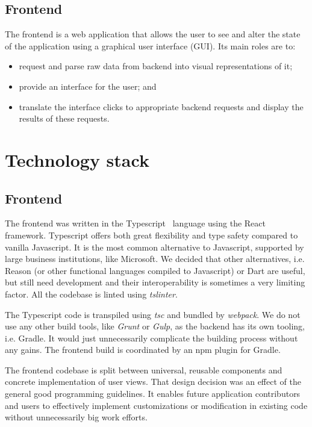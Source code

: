 \documentclass[licencjacka,en]{thesisclass}
\begin{document}
    \subsection{Frontend}
    The frontend is a web application that allows the user to see
    and alter the state of the application using a graphical user interface (GUI).
    Its main roles are to:
    \begin{itemize}
        \item request and parse raw data from backend into visual representations of it;
        \item provide an interface for the user; and
        \item translate the interface clicks to appropriate backend requests
          and display the results of these requests.
    \end{itemize}

    \section{Technology stack}

    \subsection{Frontend}

    The frontend was written in the Typescript~\cite{Typescript} language
    using the React~\cite{React} framework.
    Typescript offers both great flexibility and type safety compared to vanilla Javascript.
    It is the most common alternative to Javascript,
    supported by large business institutions, like Microsoft.
    We decided that other alternatives,
    i.e. Reason (or other functional languages compiled to Javascript) or Dart are useful,
    but still need development and their interoperability is sometimes a very limiting factor.
    All the codebase is linted using \textit{tslinter}.

    The Typescript code is transpiled
    using \textit{tsc} and bundled by \textit{webpack}.
    We do not use any other build tools, like
    \textit{Grunt} or \textit{Gulp}, as the backend has its own tooling, i.e. Gradle.
    It would just unnecessarily complicate the building process without any gains.
    The frontend build is coordinated by an npm plugin for Gradle.

    The frontend codebase is split between universal,
    reusable components
    and concrete implementation of user views.
    That design decision was an effect of the general good programming guidelines.
    It enables future application contributors and users
    to effectively implement customizations or modification
    in existing code without unnecessarily big work efforts.
\end{document}
